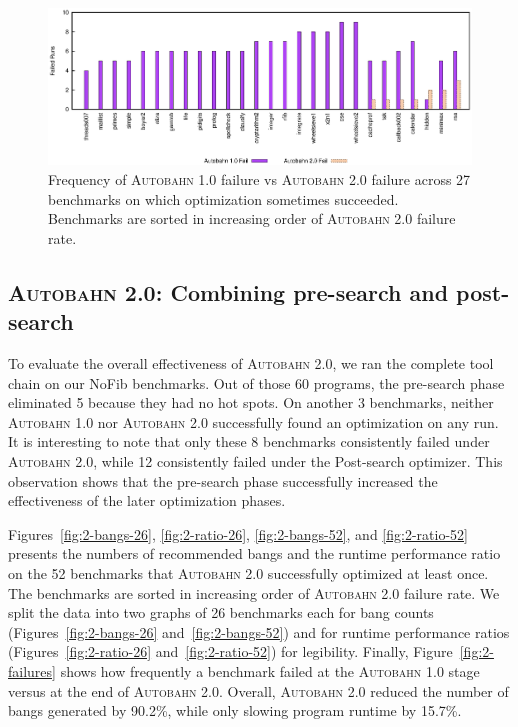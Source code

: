 \documentclass[format=sigplan, review=true]{acmart}
\newcommand{\figref}[1]{Figure~\ref{#1}}
\newcommand{\hotspots}[0]{hot spots}
\newcommand{\Ao}[0]{\textsc{Autobahn 1.0}}
\newcommand{\At}[0]{\textsc{Autobahn 2.0}}
\newcommand{\preopt}[0]{pre-search}
\newcommand{\postopt}[0]{post-search}
\newcommand{\Postopt}[0]{Post-search}
\begin{document}
\begin{figure}
\includegraphics[width=\textwidth]{aut-post-fail}
\caption{Frequency of \Ao{} failure vs \At{} failure across 27
benchmarks on which optimization sometimes succeeded. Benchmarks are sorted in
increasing order of \At{} failure rate. } 
\label{fig:post-failures}
\end{figure}

\subsection{\At{}: Combining \preopt{} and \postopt{}}

To evaluate the overall effectiveness of \At{}, we ran the complete
tool chain on our NoFib benchmarks. Out of those 60
programs, the \preopt{} phase eliminated 5 because they had
no \hotspots{}.  On another 3 benchmarks, neither \Ao{} nor \At{} 
successfully found an optimization on any run. 
It is interesting to note that only these 8
benchmarks consistently failed under \At{}, while 12
consistently failed under the \Postopt{} optimizer. 
This observation shows that the \preopt{} phase successfully
increased the effectiveness of the later optimization phases. 

Figures~\ref{fig:2-bangs-26}, \ref{fig:2-ratio-26}, \ref{fig:2-bangs-52},
and \ref{fig:2-ratio-52} presents the numbers of recommended bangs and
the runtime performance ratio on the 52 benchmarks that \At{} 
successfully optimized at least once.
The benchmarks are sorted in increasing order of \At{} failure rate.
We split the data into two graphs of 26 benchmarks each for bang counts
(Figures~\ref{fig:2-bangs-26} and~\ref{fig:2-bangs-52})
and for runtime performance ratios
(Figures~\ref{fig:2-ratio-26} and~\ref{fig:2-ratio-52})
for legibility. 
Finally, \figref{fig:2-failures} shows how frequently a
benchmark failed at the \Ao{} stage versus at the end of \At{}. Overall, \At{} reduced the number of bangs generated by 90.2\%, while only slowing program runtime by 15.7\%.
\end{document}
